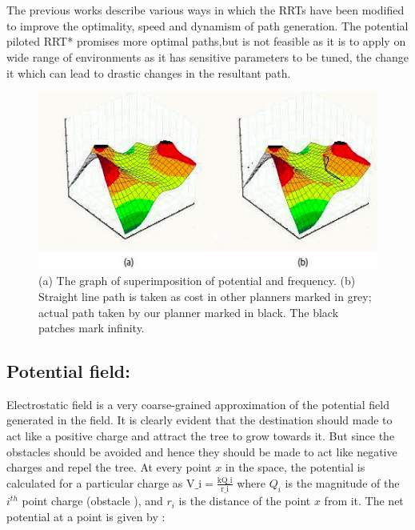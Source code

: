 \documentclass[runningheads]{llncs}
\begin{document}
\section{}
\vspace{-1mm}
The previous works describe various ways in which the RRTs have been modified to improve the optimality, speed and dynamism of path generation. The potential piloted RRT* promises more optimal paths,but is not feasible as it is to apply on wide range of environments as it has sensitive parameters to be tuned, the change it which can lead to drastic changes in the resultant path.

\begin{figure}
\begin{center}
\includegraphics[scale=0.8]{images2_tog_new2.png}
    \caption{(a) The graph of superimposition of potential and frequency. (b) Straight line path is taken as cost in other planners marked in grey; actual path taken by our planner marked in black. The black patches mark infinity.} \label{fig1}
\end{center}
\end{figure}

\subsection{Potential field:}
Electrostatic field is a very  coarse-grained approximation of the potential field generated in the field. It is clearly evident that the destination should made to act like a positive charge and attract the tree to grow towards it. But since the obstacles should be avoided and hence they should be made to act like negative charges and repel the tree. At every point $x$ in the space, the potential is calculated for a particular charge as $\text{V_{i}}=\frac{\text{kQ_{i}}}{\text{r_{i}}}$ where $Q_{i}$ is the magnitude of the $i^{th}$ point charge (obstacle ), and $r_{i}$ is the distance of the point $x$ from it. The net potential at a point is given by :
\end{document}
